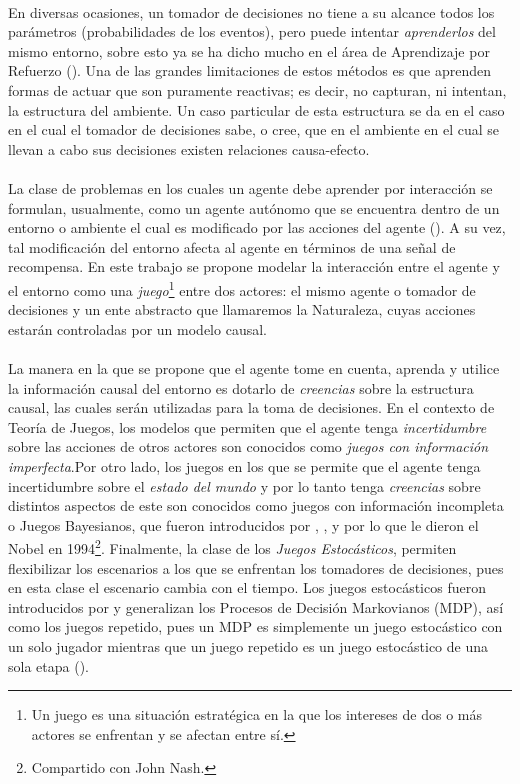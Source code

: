 \documentclass[11pt]{article}
\theoremstyle{plain}
\begin{document}
\\
\indent En diversas ocasiones, un tomador de decisiones no tiene a su alcance todos los parámetros (probabilidades de los eventos), pero puede intentar \textit{aprenderlos} del mismo entorno, sobre esto ya se ha dicho mucho en el área de Aprendizaje por Refuerzo (\cite{sutton1998reinforcement}). Una de las grandes limitaciones de estos métodos es que aprenden formas de actuar que son puramente reactivas; es decir, no capturan, ni intentan, la estructura del ambiente. Un caso particular de esta estructura se da en el caso en el cual el tomador de decisiones sabe, o cree, que en el ambiente en el cual se llevan a cabo sus decisiones existen relaciones causa-efecto.\\
\\
\indent La clase de problemas en los cuales un agente debe aprender por interacción se formulan, usualmente, como un agente autónomo que se encuentra dentro de un entorno o ambiente el cual es modificado por las acciones del agente (\cite{sutton1998reinforcement}). A su vez, tal modificación del entorno afecta al agente en términos de una señal de recompensa. En este trabajo se propone modelar la interacción entre el agente y el entorno como una \textit{juego}\footnote{Un juego es una situación estratégica en la que los intereses de dos o más actores se enfrentan y se afectan entre sí.} entre dos actores: el mismo agente o tomador de decisiones y un ente abstracto que llamaremos la Naturaleza, cuyas acciones estarán controladas por un modelo causal.\\
\\
\indent La manera en la que se propone que el agente tome en cuenta, aprenda y utilice la información causal del entorno es dotarlo de \textit{creencias} sobre la estructura causal, las cuales serán utilizadas para la toma de decisiones. En el contexto de Teoría de Juegos, los modelos que permiten que el agente tenga \textit{incertidumbre} sobre las acciones de otros actores son conocidos como \textit{juegos con información imperfecta}.Por otro lado, los juegos en los que se permite que el agente tenga incertidumbre sobre el \textit{estado del mundo} y por lo tanto tenga \textit{creencias} sobre distintos aspectos de este son conocidos como juegos con información incompleta o Juegos Bayesianos, que fueron introducidos por \cite{harsanyi1967games1}, \cite{harsanyi1968games2}, \cite{harsanyi1968games3} y por lo que le dieron el Nobel en 1994\footnote{Compartido con John Nash.}. Finalmente, la clase de los \textit{Juegos Estocásticos}, permiten flexibilizar los escenarios a los que se enfrentan los tomadores de decisiones, pues en esta clase el escenario cambia con el tiempo. Los juegos estocásticos fueron introducidos por \cite{shapley1953stochastic} y generalizan los Procesos de Decisión Markovianos (MDP), así como los juegos repetido, pues un MDP es simplemente un juego estocástico con un solo jugador mientras que un juego repetido es un juego estocástico de una sola etapa (\cite{shoham2008multiagent}).\\
\end{document}
